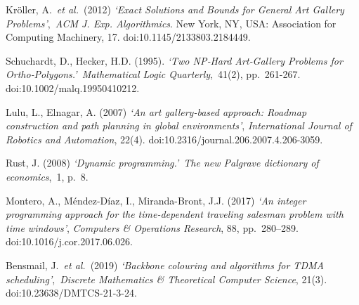 \documentclass[
]{article}
\begin{document}
Kröller, A.~\emph{et al.}~(2012) \emph{`Exact Solutions and Bounds for
General Art Gallery Problems'},~\emph{ACM J. Exp. Algorithmics}. New
York, NY, USA: Association for Computing Machinery, 17.
doi:10.1145/2133803.2184449.

Schuchardt, D., Hecker, H.D. (1995). \emph{`Two NP‐Hard Art‐Gallery
Problems for Ortho‐Polygons.'}~\emph{Mathematical Logic
Quarterly},~41(2), pp.~261-267. doi:10.1002/malq.19950410212.

Lulu, L., Elnagar, A. (2007) \emph{`An art gallery-based approach:
Roadmap construction and path planning in global environments'},
\emph{International Journal of Robotics and Automation}, 22(4).
doi:10.2316/journal.206.2007.4.206-3059.

Rust, J. (2008) \emph{`Dynamic programming.'}~\emph{The new Palgrave
dictionary of economics},~1, p.~8.

Montero, A., Méndez-Díaz, I., Miranda-Bront, J.J. (2017) \emph{`An
integer programming approach for the time-dependent traveling salesman
problem with time windows'}, \emph{Computers \& Operations Research},
88, pp.~280--289. doi:10.1016/j.cor.2017.06.026.

Bensmail, J.~\emph{et al.}~(2019) \emph{`Backbone colouring and
algorithms for TDMA scheduling'},~\emph{Discrete Mathematics \&
Theoretical Computer Science}, 21(3). doi:10.23638/DMTCS-21-3-24.
\end{document}
